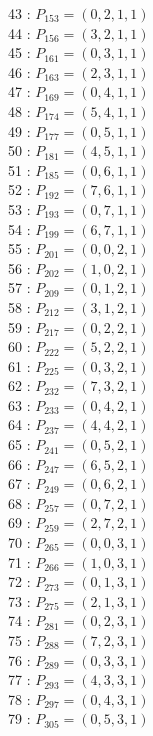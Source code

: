 \documentclass{article}
\begin{document}
{\begin{multicols}{3}
43 : $P_{153}=( 0, 2, 1, 1 )$\\
44 : $P_{156}=( 3, 2, 1, 1 )$\\
45 : $P_{161}=( 0, 3, 1, 1 )$\\
46 : $P_{163}=( 2, 3, 1, 1 )$\\
47 : $P_{169}=( 0, 4, 1, 1 )$\\
48 : $P_{174}=( 5, 4, 1, 1 )$\\
49 : $P_{177}=( 0, 5, 1, 1 )$\\
50 : $P_{181}=( 4, 5, 1, 1 )$\\
51 : $P_{185}=( 0, 6, 1, 1 )$\\
52 : $P_{192}=( 7, 6, 1, 1 )$\\
53 : $P_{193}=( 0, 7, 1, 1 )$\\
54 : $P_{199}=( 6, 7, 1, 1 )$\\
55 : $P_{201}=( 0, 0, 2, 1 )$\\
56 : $P_{202}=( 1, 0, 2, 1 )$\\
57 : $P_{209}=( 0, 1, 2, 1 )$\\
58 : $P_{212}=( 3, 1, 2, 1 )$\\
59 : $P_{217}=( 0, 2, 2, 1 )$\\
60 : $P_{222}=( 5, 2, 2, 1 )$\\
61 : $P_{225}=( 0, 3, 2, 1 )$\\
62 : $P_{232}=( 7, 3, 2, 1 )$\\
63 : $P_{233}=( 0, 4, 2, 1 )$\\
64 : $P_{237}=( 4, 4, 2, 1 )$\\
65 : $P_{241}=( 0, 5, 2, 1 )$\\
66 : $P_{247}=( 6, 5, 2, 1 )$\\
67 : $P_{249}=( 0, 6, 2, 1 )$\\
68 : $P_{257}=( 0, 7, 2, 1 )$\\
69 : $P_{259}=( 2, 7, 2, 1 )$\\
70 : $P_{265}=( 0, 0, 3, 1 )$\\
71 : $P_{266}=( 1, 0, 3, 1 )$\\
72 : $P_{273}=( 0, 1, 3, 1 )$\\
73 : $P_{275}=( 2, 1, 3, 1 )$\\
74 : $P_{281}=( 0, 2, 3, 1 )$\\
75 : $P_{288}=( 7, 2, 3, 1 )$\\
76 : $P_{289}=( 0, 3, 3, 1 )$\\
77 : $P_{293}=( 4, 3, 3, 1 )$\\
78 : $P_{297}=( 0, 4, 3, 1 )$\\
79 : $P_{305}=( 0, 5, 3, 1 )$\\

\end{multicols}}
\end{document}
